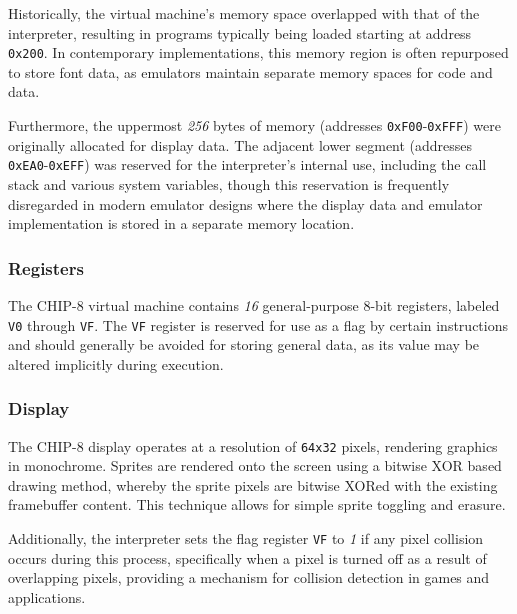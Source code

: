 \par Historically, the virtual machine's memory space overlapped with that of the interpreter, resulting in programs typically being loaded starting at address \texttt{0x200}. In contemporary implementations, this memory region is often repurposed to store font data, as emulators maintain separate memory spaces for code and data.

\par Furthermore, the uppermost \textit{256} bytes of memory (addresses \texttt{0xF00}-\texttt{0xFFF}) were originally allocated for display data. The adjacent lower segment (addresses \texttt{0xEA0}-\texttt{0xEFF}) was reserved for the interpreter's internal use, including the call stack and various system variables, though this reservation is frequently disregarded in modern emulator designs where the display data and emulator implementation is stored in a separate memory location.

\subsubsection{Registers}

\par The CHIP-8 virtual machine contains \textit{16} general-purpose 8-bit registers, labeled \texttt{V0} through \texttt{VF}. The \texttt{VF} register is reserved for use as a flag by certain instructions and should generally be avoided for storing general data, as its value may be altered implicitly during execution.

\subsubsection{Display}

\par The CHIP-8 display operates at a resolution of \texttt{64x32} pixels, rendering graphics in monochrome. Sprites are rendered onto the screen using a bitwise XOR based drawing method, whereby the sprite pixels are bitwise XORed with the existing framebuffer content. This technique allows for simple sprite toggling and erasure.

\par Additionally, the interpreter sets the flag register \texttt{VF} to \textit{1} if any pixel collision occurs during this process, specifically when a pixel is turned off as a result of overlapping pixels, providing a mechanism for collision detection in games and applications.

